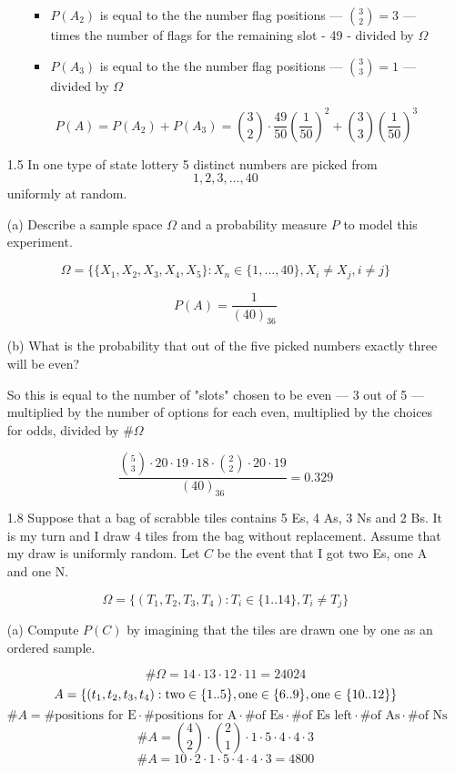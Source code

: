 \documentclass[10pt]{article}
\begin{document}
\begin{itemize}
\begin{enumerate}
      \begin{itemize}
        \item $P(A_2)$ is equal to the the number flag positions --- 
          $\binom{3}{2} = 3$ --- times 
      the number of flags for the remaining slot - 49 - divided by $\Omega$
        \item $P(A_3)$ is equal to the the number flag positions --- 
          $\binom{3}{3} = 1$ --- 
      divided by $\Omega$
      \end{itemize}
      \[
        P(A)=P(A_2)+P(A_3)=\binom{3}{2} \cdot \frac{49}{50}  \left( \frac{1}{50} \right)^2 +
                            \binom{3}{3} \left( \frac{1}{50} \right)^3
      \]
  \end{enumerate}

\item[1.5] In one type of state lottery 5 distinct numbers are picked from
  $$1,2,3, \ldots, 40$$
  uniformly at random.

(a) Describe a sample space $\Omega$ and a probability measure $P$ to model
this experiment.

\[ \Omega = \{ \{X_1,X_2,X_3,X_4,X_5\}: X_n \in \{1, \ldots, 40\}, X_i \neq X_j, i \neq j \} \]

\[ P(A) = \frac{1}{(40)_{36}} \]

(b) What is the probability that out of the five picked numbers exactly
three will be even?

  So this is equal to the number of "slots" chosen to be even --- 3
  out of 5 --- multiplied by the number of options for each even,
  multiplied by the choices for odds, divided by $\#\Omega$

  \[\frac{\binom{5}{3} \cdot 20 \cdot 19 \cdot 18 \cdot
    \binom{2}{2} \cdot 20 \cdot 19}
        {(40)_{36}} = 0.329
      \]

\newpage
\item[1.8] Suppose that a bag of scrabble tiles contains 5 Es, 4 As, 3 Ns and 2
  Bs. It is my turn and I draw 4 tiles from the bag without replacement. Assume
  that my draw is uniformly random. Let $C$ be the event that I got two Es,
  one A and one N.

  \[ \Omega = \{ (T_1, T_2, T_3, T_4):T_i \in \{1..14\}, T_i \neq T_j \} \]

(a) Compute $P(C)$ by imagining that the tiles are drawn one by one as an
  ordered sample.

  \[ \#\Omega = 14 \cdot 13 \cdot 12 \cdot 11  = 24024\]
  \[ A = \{ (t_1, t_2, t_3, t_4): \text{two} \in \{1..5\}, \\
      \text{one} \in \{6..9\}, \\
      \text{one} \in \{10..12\}
        \}
  \]
  \[ \#A = \text{\# positions for E} \cdot \text{\# positions for A} \cdot
      \text{\# of Es} \cdot \text{\# of Es left} \cdot \text{\# of As} \cdot
      \text{\# of Ns}
    \]
    \[ \#A = \binom{4}{2} \cdot \binom{2}{1} \cdot 1 \cdot
    5 \cdot 4 \cdot 4 \cdot 3 \]
    \[ \#A = 10 \cdot 2 \cdot 1 \cdot 5 \cdot 4 \cdot 4 \cdot 3  = 4800\]


\end{itemize}
\end{document}
